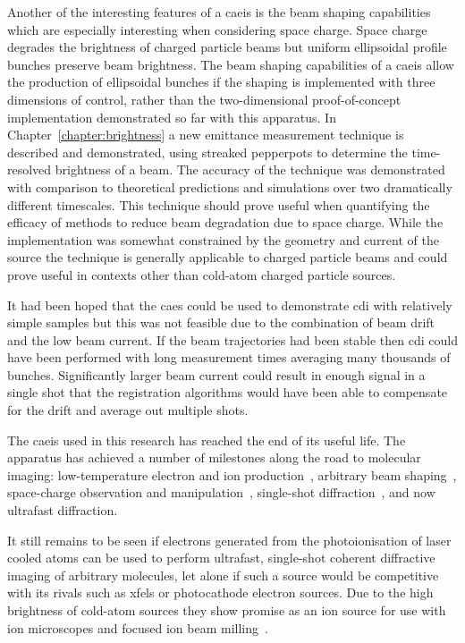 Another of the interesting features of a \gls{caeis} is the beam shaping capabilities which are especially interesting when considering space charge.
Space charge degrades the brightness of charged particle beams but uniform ellipsoidal profile bunches preserve beam brightness.
The beam shaping capabilities of a \gls{caeis} allow the production of ellipsoidal bunches if the shaping is implemented with three dimensions of control, rather than the two-dimensional proof-of-concept implementation demonstrated so far with this apparatus.
In Chapter~\ref{chapter:brightness} a new emittance measurement technique is described and demonstrated, using streaked pepperpots to determine the time-resolved brightness of a beam.
The accuracy of the technique was demonstrated with comparison to theoretical predictions and simulations over two dramatically different timescales.
This technique should prove useful when quantifying the efficacy of methods to reduce beam degradation due to space charge.
While the implementation was somewhat constrained by the geometry and current of the source the technique is generally applicable to charged particle beams and could prove useful in contexts other than cold-atom charged particle sources.

It had been hoped that the \gls{caes} could be used to demonstrate \gls{cdi} with relatively simple samples but this was not feasible due to the combination of beam drift and the low beam current.
If the beam trajectories had been stable then \gls{cdi} could have been performed with long measurement times averaging many thousands of bunches.
Significantly larger beam current could result in enough signal in a single shot that the registration algorithms would have been able to compensate for the drift and average out multiple shots.

The \gls{caeis} used in this research has reached the end of its useful life.
The apparatus has achieved a number of milestones along the road to molecular imaging: low-temperature electron and ion production~\cite{saliba_spatial_2012,mcculloch_high-coherence_2013,mcculloch_field_2017,speirs_identification_2017}, arbitrary beam shaping~\cite{mcculloch_arbitrarily_2011}, space-charge observation and manipulation~\cite{murphy_detailed_2014,murphy_increasing_2015,thompson_suppression_2016}, single-shot diffraction~\cite{speirs_single-shot_2015}, and now ultrafast diffraction.

It still remains to be seen if electrons generated from the photoionisation of laser cooled atoms can be used to perform ultrafast, single-shot coherent diffractive imaging of arbitrary molecules, let alone if such a source would be competitive with its rivals such as \glspl{xfel} or photocathode electron sources.
Due to the high brightness of cold-atom sources they show promise as an ion source for use with ion microscopes and focused ion beam milling~\cite{steele_high-brightness_2017}.

